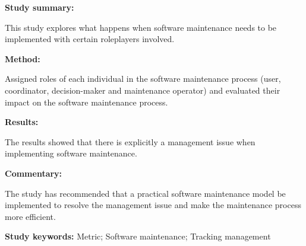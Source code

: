 \begin{tcolorbox}[colback=gray!5!white, colframe=pastelgreen!40!black, title=Metric-based tracking management in software maintenance\cite{Tang2010}]
	\begin{minipage}[t]{0.25\textwidth}
		\textbf{Study summary:}
	\end{minipage}
	\hfill
	\begin{minipage}[t]{0.65\textwidth}
		This study explores what happens when software maintenance needs to be implemented with certain roleplayers involved.
	\end{minipage}

	\vspace{0.75em} 

	\begin{minipage}[t]{0.25\textwidth}
		\textbf{Method:}
	\end{minipage}
	\hfill
	\begin{minipage}[t]{0.65\textwidth}
		Assigned roles of each individual in the software maintenance process (user, coordinator, decision-maker and maintenance operator) and evaluated their impact on the software maintenance process. 
	\end{minipage}

	\vspace{0.75em} 

	\begin{minipage}[t]{0.25\textwidth}
		\textbf{Results:}
	\end{minipage}
	\hfill
	\begin{minipage}[t]{0.65\textwidth}
		The results showed that there is explicitly a management issue when implementing software maintenance. 
	\end{minipage}

	\vspace{0.75em} 

	\begin{minipage}[t]{0.25\textwidth}
		\textbf{Commentary:}
	\end{minipage}
	\hfill
	\begin{minipage}[t]{0.65\textwidth}
		The study has recommended that a practical software maintenance model be implemented to resolve the management issue and make the maintenance process more efficient.
	\end{minipage}
	\tcblower
	\textbf{Study keywords:} Metric; Software maintenance; Tracking management
\end{tcolorbox}


